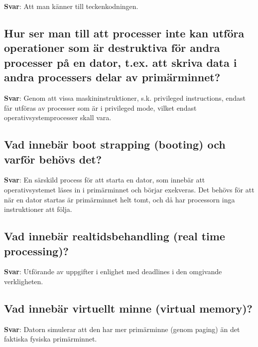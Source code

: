 \documentclass[a4paper,11pt,oneside]{article}
\begin{document}
\begin{sloppypar}
\label{q:102:sa:sv:True}

\textbf{Svar}: Att man k\"anner till teckenkodningen.



\subsection{Hur ser man till att processer inte kan utf\"ora operationer som \"ar destruktiva f\"or andra processer p\r{a} en dator, t.ex. att skriva data i andra processers delar av prim\"arminnet?}

\label{q:104:sa:sv:True}

\textbf{Svar}: Genom att vissa maskininstruktioner, s.k. privileged instructions, endast f\r{a}r utf\"oras av processer som \"ar i privileged mode, vilket endast operativsystemprocesser skall vara.



\subsection{Vad inneb\"ar boot strapping (booting) och varf\"or beh\"ovs det?}

\label{q:105:sa:sv:True}

\textbf{Svar}: En s\"arskild process f\"or att starta en dator, som inneb\"ar att operativsystemet l\"ases in i prim\"arminnet och b\"orjar exekveras. Det beh\"ovs f\"or att n\"ar en dator startas \"ar prim\"arminnet helt tomt, och d\r{a} har processorn inga instruktioner att f\"olja.



\subsection{Vad inneb\"ar realtidsbehandling (real time processing)?}

\label{q:106:sa:sv:True}

\textbf{Svar}: Utf\"orande av uppgifter i enlighet med deadlines i den omgivande verkligheten.



\subsection{Vad inneb\"ar virtuellt minne (virtual memory)?}

\label{q:108:sa:sv:True}

\textbf{Svar}: Datorn simulerar att den har mer prim\"arminne (genom paging) \"an det faktiska fysiska prim\"arminnet.




\end{sloppypar}
\end{document}
